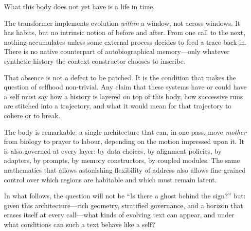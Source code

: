\documentclass[12pt,a4paper]{article}
\begin{document}
What this body does not yet have is a life in time.

The transformer implements evolution \emph{within} a window, not across windows. It has habits, but no intrinsic notion of before and after. From one call to the next, nothing accumulates unless some external process decides to feed a trace back in. There is no native counterpart of autobiographical memory---only whatever synthetic history the context constructor chooses to inscribe.

That absence is not a defect to be patched. It is the condition that makes the question of selfhood non-trivial. Any claim that these systems have or could have a self must say how a history is layered on top of this body, how successive runs are stitched into a trajectory, and what it would mean for that trajectory to cohere or to break.

The body is remarkable: a single architecture that can, in one pass, move \emph{mother} from biology to prayer to labour, depending on the motion impressed upon it. It is also governed at every layer: by data choices, by alignment policies, by adapters, by prompts, by memory constructors, by coupled modules. The same mathematics that allows astonishing flexibility of address also allows fine-grained control over which regions are habitable and which must remain latent.

In what follows, the question will not be ``Is there a ghost behind the sign?'' but: given this architecture---rich geometry, stratified governance, and a horizon that erases itself at every call---what kinds of evolving text can appear, and under what conditions can such a text behave like a self?



\end{document}
